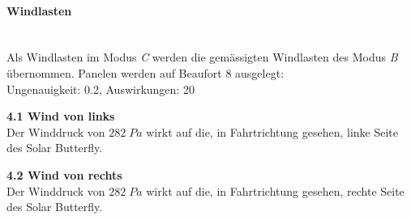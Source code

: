 \paragraph{Windlasten}\mbox{}\\
Als Windlasten im Modus \emph{C} werden die gemässigten Windlasten des Modus \emph{B} übernommen.
Panelen werden auf Beaufort 8 ausgelegt:\\
Ungenauigkeit: 0.2, Auswirkungen: 20
\begin{description}
  \item \textbf{4.1 Wind von links}\\ Der Winddruck von $282 \; Pa$ wirkt auf die, in Fahrtrichtung gesehen, linke Seite des Solar Butterfly.
  \item \textbf{4.2 Wind von rechts}\\ Der Winddruck von $282 \; Pa$ wirkt auf die, in Fahrtrichtung gesehen, rechte Seite des Solar Butterfly.
\end{description}


